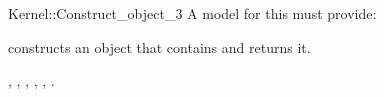 \begin{ccRefFunctionObjectConcept}{Kernel::Construct_object_3}
A model for this must provide:


{constructs an object that contains  and returns it.}

\ccSeeAlso
{},
,
,
,
,
.

\ccIsModel{}

\end{ccRefFunctionObjectConcept}
